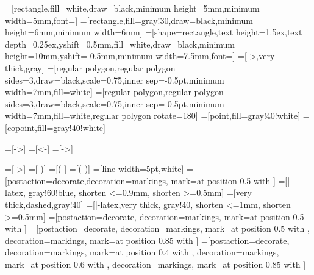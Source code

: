 
=[rectangle,fill=white,draw=black,minimum height=5mm,minimum width=5mm,font=\small]
=[rectangle,fill=gray!30,draw=black,minimum height=6mm,minimum width=6mm]
=[shape=rectangle,text height=1.5ex,text depth=0.25ex,yshift=0.5mm,fill=white,draw=black,minimum height=10mm,yshift=-0.5mm,minimum width=7.5mm,font={\small}]
=[->,very thick,gray]
=[regular polygon,regular polygon sides=3,draw=black,scale=0.75,inner sep=-0.5pt,minimum width=7mm,fill=white]
=[regular polygon,regular polygon sides=3,draw=black,scale=0.75,inner sep=-0.5pt,minimum width=7mm,fill=white,regular polygon rotate=180]
=[point,fill=gray!40!white]
=[copoint,fill=gray!40!white]

\newcommand{\edgearrow}{{\arrow[black]{>}}}
\newcommand{\edgetick}{{\arrow[black,scale=0.7,very thick]{|}}}



=[->]
=[<-]
=[->]



=[->]
=[-)]
=[(-]
=[(-)]
=[line width=5pt,white]
=[postaction=decorate,decoration={markings, mark=at position 0.5 with \edgetick}]
=[|-latex, gray!60!blue, shorten <=0.9mm, shorten >=0.5mm]
=[very thick,dashed,gray!40]
=[|-latex,very thick, gray!40, shorten <=1mm, shorten >=0.5mm]
=[postaction=decorate,
  decoration={markings, mark=at position 0.5 with \edgetick}]
=[postaction=decorate,
  decoration={markings, mark=at position 0.5 with \edgetick},
  decoration={markings, mark=at position 0.85 with \edgearrow}]
=[postaction=decorate,
  decoration={markings, mark=at position 0.4 with \edgetick},
  decoration={markings, mark=at position 0.6 with \edgetick},
  decoration={markings, mark=at position 0.85 with \edgearrow}]

